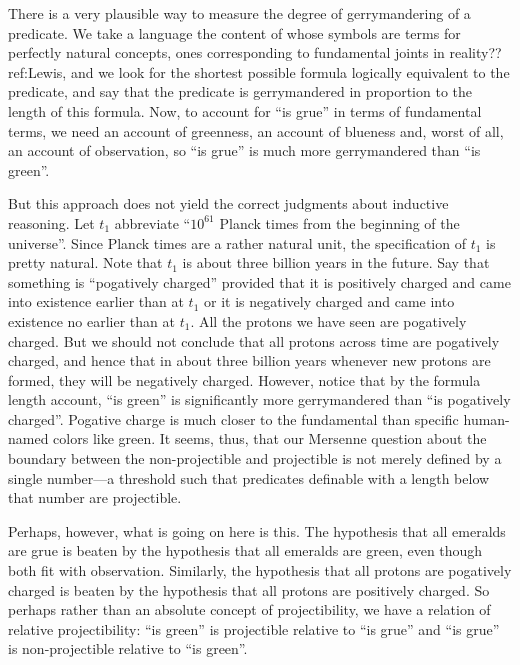 There is a very plausible way to measure the degree of gerrymandering of a predicate. We take a language the content of 
whose symbols are terms for perfectly natural concepts, ones corresponding to fundamental joints in reality??ref:Lewis,
and we look for the shortest possible formula logically equivalent to the predicate, and say that the predicate is 
gerrymandered in proportion to the length of this formula. Now, to account for ``is grue'' in terms of fundamental
terms, we need an account of greenness, an account of blueness and, worst of all, an account of observation, so
``is grue'' is much more gerrymandered than ``is green''.

But this approach does not yield the correct judgments about inductive reasoning. Let $t_1$ abbreviate ``$10^{61}$ Planck times from the beginning of
the universe''. Since Planck times are a rather natural unit, the specification of $t_1$ is pretty natural. Note
that $t_1$ is about three billion years in the future.  Say that something is ``pogatively charged'' provided that
it is positively charged and came into existence earlier than at $t_1$ or it is negatively charged and came into existence 
no earlier than at $t_1$. All the protons we have seen are pogatively charged. But we should not conclude that
all protons across time are pogatively charged, and hence that in about three billion years whenever new protons are formed,
they will be negatively charged. However, notice that by the formula length account, ``is green'' is significantly
more gerrymandered than ``is pogatively charged''. Pogative charge is much closer to the fundamental than specific
human-named colors like green. It seems, thus, that our Mersenne question
about the boundary between the non-projectible and projectible is not merely defined by a single number---a threshold such that
predicates definable with a length below that number are projectible. 

Perhaps, however, what is going on here is this. The hypothesis that all emeralds are grue is beaten by the hypothesis that 
all emeralds are green, even though both fit with observation. Similarly, the hypothesis that all protons are pogatively charged 
is beaten by the hypothesis that all protons are positively charged. So perhaps rather than an absolute concept of projectibility, we
have a relation of relative projectibility: ``is green'' is projectible relative to ``is grue'' and ``is grue'' is 
non-projectible relative to ``is green''. 

